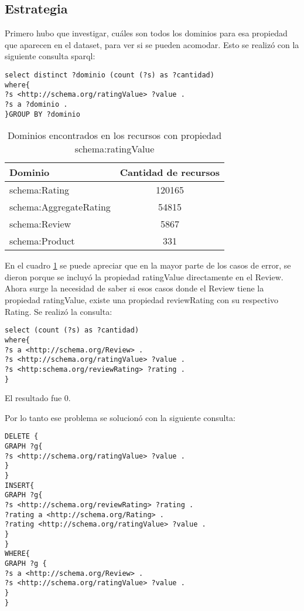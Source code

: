 \subsection*{Estrategia}
Primero hubo que investigar, cuáles son todos los dominios para esa propiedad que aparecen en el dataset, para ver si se pueden 
acomodar. Esto se realizó con la siguiente consulta sparql:

\begin{lstlisting}[frame=single]  
select distinct ?dominio (count (?s) as ?cantidad) 
where{
?s <http://schema.org/ratingValue> ?value .
?s a ?dominio .
}GROUP BY ?dominio
\end{lstlisting}

\begin{table}[h]
\begin{tabular}{| l | c |}\hline
 Dominio & Cantidad de recursos \\\hline
 schema:Rating & 120165\\
 schema:AggregateRating & 54815 \\
 schema:Review & 5867 \\
 schema:Product & 331 \\\hline
\end{tabular}
\caption{Dominios encontrados en los recursos con propiedad schema:ratingValue}
\label{table:ratingValueDomains}
\end{table}

En el cuadro \ref{table:ratingValueDomains} se puede apreciar que en la mayor parte de los casos de error, se dieron porque se incluyó la propiedad ratingValue directamente en 
el Review. Ahora surge la necesidad de saber si esos casos donde el Review tiene la propiedad ratingValue, existe una propiedad reviewRating 
con su respectivo Rating.
Se realizó la consulta:

\begin{lstlisting}[frame=single]  
select (count (?s) as ?cantidad) 
where{
?s a <http://schema.org/Review> . 
?s <http://schema.org/ratingValue> ?value . 
?s <http:schema.org/reviewRating> ?rating . 
}
\end{lstlisting}

El resultado fue 0.

Por lo tanto ese problema se solucionó con la siguiente consulta:

\begin{lstlisting}[frame=single]  
DELETE { 
GRAPH ?g{ 
?s <http://schema.org/ratingValue> ?value . 
} 
} 
INSERT{ 
GRAPH ?g{ 
?s <http://schema.org/reviewRating> ?rating . 
?rating a <http://schema.org/Rating> . 
?rating <http://schema.org/ratingValue> ?value . 
}
}
WHERE{
GRAPH ?g {
?s a <http://schema.org/Review> .
?s <http://schema.org/ratingValue> ?value .
}
}
\end{lstlisting}


